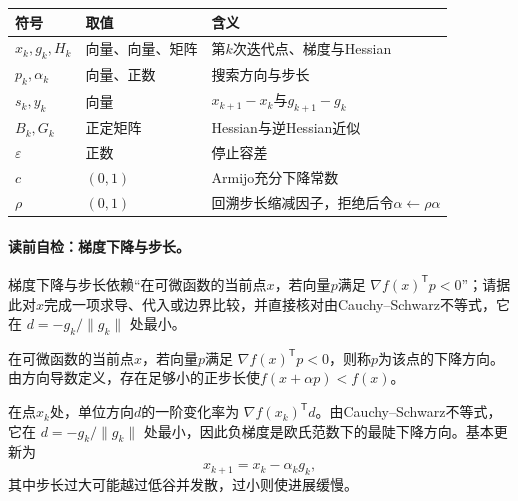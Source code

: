 \label{struct:V1-C08-CH05}
\begin{symboltablebox}
\begin{tabularx}{\linewidth}{@{}l l X@{}}
\toprule 符号 & 取值 & 含义\\ \midrule
$x_k,g_k,H_k$ & 向量、向量、矩阵 & 第$k$次迭代点、梯度与Hessian\\
$p_k,\alpha_k$ & 向量、正数 & 搜索方向与步长\\
$s_k,y_k$ & 向量 & $x_{k+1}-x_k$与$g_{k+1}-g_k$\\
$B_k,G_k$ & 正定矩阵 & Hessian与逆Hessian近似\\
$\varepsilon$ & 正数 & 停止容差\\
$c$ & $(0,1)$ & Armijo充分下降常数\\
$\rho$ & $(0,1)$ & 回溯步长缩减因子，拒绝后令$\alpha\leftarrow\rho\alpha$\\
\bottomrule
\end{tabularx}
\end{symboltablebox}

\paragraph{读前自检：梯度下降与步长。}梯度下降与步长依赖“在可微函数的当前点$x$，若向量$p$满足 $\nabla f(x)^{\mathsf T}p<0$”；请据此对$x$完成一项求导、代入或边界比较，并直接核对由Cauchy--Schwarz不等式，它在 $d=-g_k/\|g_k\|$ 处最小。\par

\label{struct:V1-C08-CH06}
\begin{definition}[下降方向]\label{struct:V1-C08-CH07}
在可微函数的当前点$x$，若向量$p$满足 $\nabla f(x)^{\mathsf T}p<0$，则称$p$为该点的下降方向。由方向导数定义，存在足够小的正步长使$f(x+\alpha p)<f(x)$。
\end{definition}
在点$x_k$处，单位方向$d$的一阶变化率为 $\nabla f(x_k)^{\mathsf T}d$。由Cauchy--Schwarz不等式，它在 $d=-g_k/\|g_k\|$ 处最小，因此负梯度是欧氏范数下的最陡下降方向。基本更新为
\[
x_{k+1}=x_k-\alpha_k g_k,
\]
其中步长过大可能越过低谷并发散，过小则使进展缓慢。

